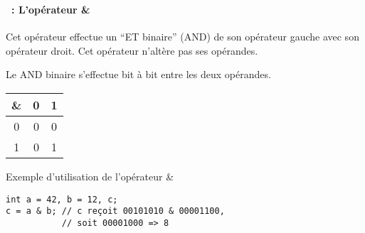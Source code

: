 \begin{frame}[containsverbatim]
  \frametitle{\secname}
  \framesubtitle{\subsecname~: L'opérateur \&} 

  Cet opérateur effectue un ``ET binaire'' (AND) de son opérateur gauche avec son opérateur droit. Cet opérateur n'altère pas ses opérandes.
  \vspace{0.3cm}
  \par
  Le AND binaire s'effectue bit à bit entre les deux opérandes.
  \par
  \begin{center}
    \begin{tabular}{|c|c|c|}
      \hline
      \& & 0 & 1 \\
      \hline
      0  & 0 & 0 \\
      \hline
      1  & 0 & 1 \\
      \hline
    \end{tabular}
  \end{center}
  \begin{exampleblock}{Exemple d'utilisation de l'opérateur \&}
    \begin{verbatim}
int a = 42, b = 12, c;
c = a & b; // c reçoit 00101010 & 00001100, 
           // soit 00001000 => 8\end{verbatim}
  \end{exampleblock}
\end{frame}

